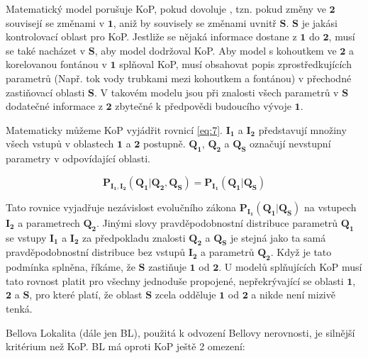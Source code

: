 Matematický model porušuje KoP, pokud dovoluje , tzn. pokud změny ve $\bm{2}$ souvisejí se změnami v $\bm{1}$, aniž by souvisely se změnami uvnitř $\bm{S}$. $\bm{S}$ je jakási kontrolovací oblast pro KoP. Jestliže se nějaká informace dostane z $\bm{1}$ do $\bm{2}$, musí se také nacházet v $\bm{S}$, aby model dodržoval KoP. Aby model s kohoutkem ve $\bm{2}$ a korelovanou fontánou v $\bm{1}$ splňoval KoP, musí obsahovat popis zprostředkujících parametrů (Např. tok vody trubkami mezi kohoutkem a fontánou) v přechodné zastiňovací oblasti $\bm{S}$. V takovém modelu jsou při znalosti všech parametrů v $\bm{S}$ dodatečné informace z $\bm{2}$ zbytečné k předpovědi budoucího vývoje $\bm{1}$.

Matematicky můžeme KoP vyjádřit rovnicí \ref{eq:7}. $\bm{I_{1}}$ a $\bm{I_{2}}$ představují množiny všech vstupů v oblastech $\bm{1}$ a $\bm{2}$ postupně. $\bm{Q_{1}}$, $\bm{Q_{2}}$ a $\bm{Q_{S}}$ označují nevstupní parametry v odpovídající oblasti.

\begin{equation}
    \bm{P_{I_{1},I_{2}}(Q_{1}|Q_{2}, Q_{S}) = P_{I_{1}}(Q_{1}|Q_{S})}
    \label{eq:7}
\end{equation}

Tato rovnice vyjadřuje nezávislost evolučního zákona $\bm{P_{I_{1}}(Q_{1}|Q_{S})}$ na vstupech $\bm{I_{2}}$ a parametrech $\bm{Q_{2}}$. Jinými slovy pravděpodobnostní distribuce parametrů $\bm{Q_{1}}$ se vstupy $\bm{I_{1}}$ a $\bm{I_{2}}$ za předpokladu znalosti $\bm{Q_{2}}$ a $\bm{Q_{S}}$ je stejná jako ta samá pravděpodobnostní distribuce bez vstupů $\bm{I_{2}}$ a parametrů $\bm{Q_{2}}$. Když je tato podmínka splněna, říkáme, že $\bm{S}$ zastiňuje $\bm{1}$ od $\bm{2}$. U modelů splňujících KoP musí tato rovnost platit pro všechny jednoduše propojené, nepřekrývající se oblasti $\bm{1}$, $\bm{2}$ a $\bm{S}$, pro které platí, že oblast $\bm{S}$ zcela odděluje $\bm{1}$ od $\bm{2}$ a nikde není mizivě tenká.

Bellova Lokalita (dále jen BL), použitá k odvození Bellovy nerovnosti, je silnější kritérium než KoP. BL má oproti KoP ještě 2 omezení:


